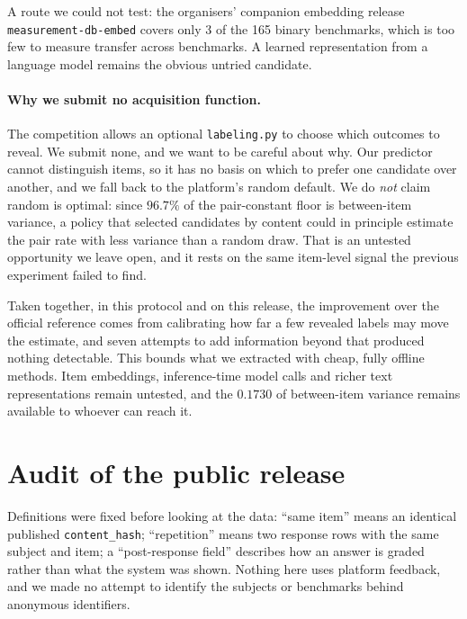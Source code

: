 \documentclass{article}
\begin{document}
A route we could not test: the organisers' companion embedding release
\texttt{measurement-db-embed} covers only 3 of the 165 binary benchmarks, which is
too few to measure transfer across benchmarks. A learned representation from a
language model remains the obvious untried candidate.

\paragraph{Why we submit no acquisition function.} The competition allows an
optional \texttt{labeling.py} to choose which outcomes to reveal. We submit none,
and we want to be careful about why. Our predictor cannot distinguish items, so it
has no basis on which to prefer one candidate over another, and we fall back to
the platform's random default. We do \emph{not} claim random is optimal: since
$96.7\%$ of the pair-constant floor is between-item variance, a policy that
selected candidates by content could in principle estimate the pair rate with
less variance than a random draw. That is an untested opportunity we leave open,
and it rests on the same item-level signal the previous experiment failed to find.

Taken together, in this protocol and on this release, the improvement over the
official reference comes from calibrating how far a few revealed labels may move
the estimate, and seven attempts to add information beyond that produced nothing
detectable. This bounds what we extracted with cheap, fully offline methods.
Item embeddings, inference-time model calls and richer text representations
remain untested, and the $0.1730$ of between-item variance remains available to
whoever can reach it.

\section{Audit of the public release}

Definitions were fixed before looking at the data: ``same item'' means an
identical published \texttt{content\_hash}; ``repetition'' means two response rows
with the same subject and item; a ``post-response field'' describes how an answer
is graded rather than what the system was shown. Nothing here uses platform
feedback, and we made no attempt to identify the subjects or benchmarks behind
anonymous identifiers.
\end{document}
